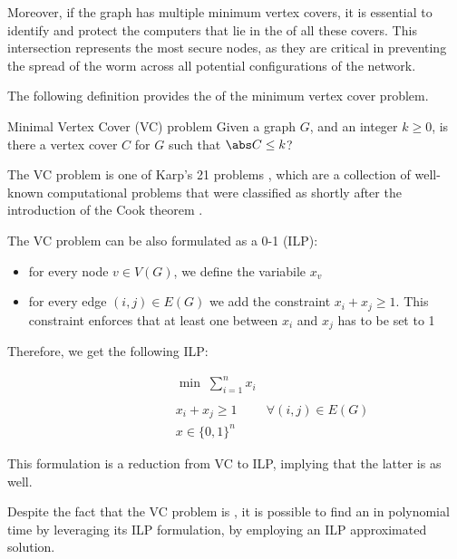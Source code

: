 \documentclass[a4paper, 12pt]{report}
\begin{document}
    Moreover, if the graph has multiple minimum vertex covers, it is essential to identify and protect  the computers that lie in the  of all these covers. This intersection represents the most secure nodes, as they are critical in preventing the spread of the worm across all potential configurations of the network.

    The following definition provides the  of the minimum vertex cover problem.

    \begin{frameddefn}{Minimal Vertex Cover (VC) problem}
        Given a graph $G$, and an integer $k \ge 0$, is there a vertex cover $C$ for $G$ such that $\abs C \le k$?
    \end{frameddefn}

    The VC problem is one of Karp's 21 \NPComplete problems \cite{karp}, which are a collection of well-known computational problems that were classified as \NPComplete shortly after the introduction of the Cook theorem \cite{cook}.

    The VC problem can be also formulated as a 0-1  (ILP):
    \begin{itemize}
        \item for every node $v \in V(G)$, we define the variabile $x_v$
        \item for every edge $(i,j) \in E(G)$ we add the constraint $x_i + x_j \geq 1$. This constraint enforces that at least one between $x_i$ and $x_j$ has to be set to 1
    \end{itemize}

    Therefore, we get the following ILP:

    \[\begin{array}{ccc}
        \qquad\qquad\quad
        & \min \; \sum\limits_{i = 1}^n x_i \\\\
        & x_i + x_j \geq 1 & \forall (i,j) \in E(G) \\
        & x \in \{0,1\}^n
    \end{array}\]

    This formulation is a reduction from VC to ILP, implying that the latter is \NPComplete as well.

    Despite the fact that the VC problem is \NPComplete, it is possible to find an  in polynomial time by leveraging its ILP formulation, by employing an ILP approximated solution.
\end{document}
